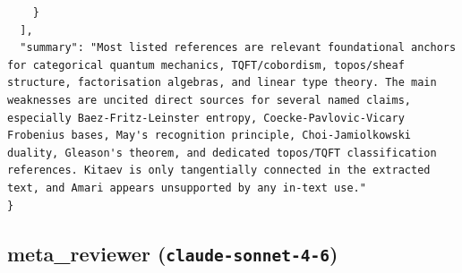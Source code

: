 \documentclass[11pt]{article}
\begin{document}
\begin{verbatim}
    }
  ],
  "summary": "Most listed references are relevant foundational anchors for categorical quantum mechanics, TQFT/cobordism, topos/sheaf structure, factorisation algebras, and linear type theory. The main weaknesses are uncited direct sources for several named claims, especially Baez-Fritz-Leinster entropy, Coecke-Pavlovic-Vicary Frobenius bases, May's recognition principle, Choi-Jamiolkowski duality, Gleason's theorem, and dedicated topos/TQFT classification references. Kitaev is only tangentially connected in the extracted text, and Amari appears unsupported by any in-text use."
}
\end{verbatim}

\subsection*{meta_reviewer (\texttt{claude-sonnet-4-6})}
\end{document}
